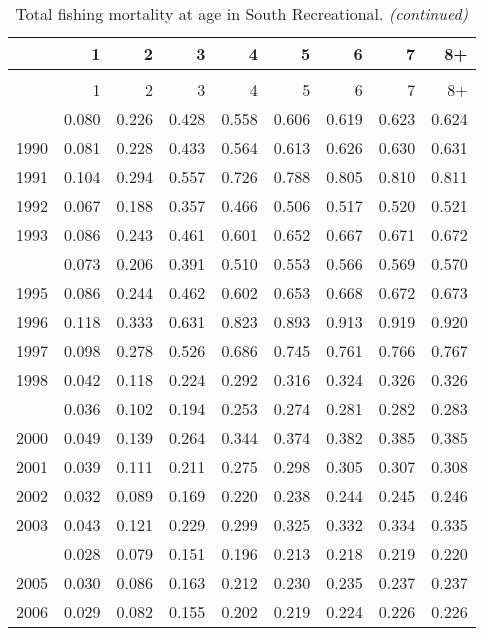 \documentclass[
]{article}
\begin{document}
\begin{longtable}[t]{lrrrrrrrr}
\caption{\label{tab:South_Recreational-fleet-FAA-table}Total fishing mortality at age in South Recreational.}\\
\toprule
  & 1 & 2 & 3 & 4 & 5 & 6 & 7 & 8+\\
\midrule
\endfirsthead
\caption[]{Total fishing mortality at age in South Recreational. \textit{(continued)}}\\
\toprule
  & 1 & 2 & 3 & 4 & 5 & 6 & 7 & 8+\\
\midrule
\endhead

\endfoot
\bottomrule
\endlastfoot
1989 & 0.080 & 0.226 & 0.428 & 0.558 & 0.606 & 0.619 & 0.623 & 0.624\\
1990 & 0.081 & 0.228 & 0.433 & 0.564 & 0.613 & 0.626 & 0.630 & 0.631\\
1991 & 0.104 & 0.294 & 0.557 & 0.726 & 0.788 & 0.805 & 0.810 & 0.811\\
1992 & 0.067 & 0.188 & 0.357 & 0.466 & 0.506 & 0.517 & 0.520 & 0.521\\
1993 & 0.086 & 0.243 & 0.461 & 0.601 & 0.652 & 0.667 & 0.671 & 0.672\\
\addlinespace
1994 & 0.073 & 0.206 & 0.391 & 0.510 & 0.553 & 0.566 & 0.569 & 0.570\\
1995 & 0.086 & 0.244 & 0.462 & 0.602 & 0.653 & 0.668 & 0.672 & 0.673\\
1996 & 0.118 & 0.333 & 0.631 & 0.823 & 0.893 & 0.913 & 0.919 & 0.920\\
1997 & 0.098 & 0.278 & 0.526 & 0.686 & 0.745 & 0.761 & 0.766 & 0.767\\
1998 & 0.042 & 0.118 & 0.224 & 0.292 & 0.316 & 0.324 & 0.326 & 0.326\\
\addlinespace
1999 & 0.036 & 0.102 & 0.194 & 0.253 & 0.274 & 0.281 & 0.282 & 0.283\\
2000 & 0.049 & 0.139 & 0.264 & 0.344 & 0.374 & 0.382 & 0.385 & 0.385\\
2001 & 0.039 & 0.111 & 0.211 & 0.275 & 0.298 & 0.305 & 0.307 & 0.308\\
2002 & 0.032 & 0.089 & 0.169 & 0.220 & 0.238 & 0.244 & 0.245 & 0.246\\
2003 & 0.043 & 0.121 & 0.229 & 0.299 & 0.325 & 0.332 & 0.334 & 0.335\\
\addlinespace
2004 & 0.028 & 0.079 & 0.151 & 0.196 & 0.213 & 0.218 & 0.219 & 0.220\\
2005 & 0.030 & 0.086 & 0.163 & 0.212 & 0.230 & 0.235 & 0.237 & 0.237\\
2006 & 0.029 & 0.082 & 0.155 & 0.202 & 0.219 & 0.224 & 0.226 & 0.226\\

\end{longtable}
\end{document}
